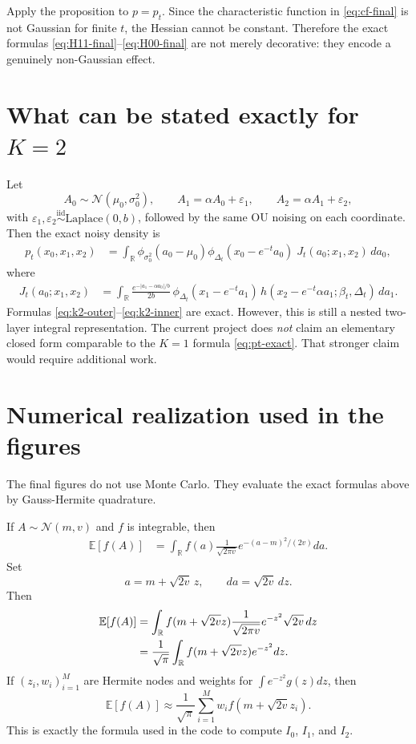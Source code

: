 \documentclass[11pt,a4paper]{article}
\newcommand{\R}{\mathbb{R}}
\newcommand{\E}{\mathbb{E}}
\newcommand{\Dt}{\Delta_t}
\newcommand{\pt}{p_t}
\begin{document}
Apply the proposition to $p=\pt$. Since the characteristic function in \eqref{eq:cf-final} is not Gaussian for finite $t$, the Hessian cannot be constant. Therefore the exact formulas \eqref{eq:H11-final}--\eqref{eq:H00-final} are not merely decorative: they encode a genuinely non-Gaussian effect.

\section[What can be stated exactly for K=2]{What can be stated exactly for $K=2$}
\label{sec:k2-statement}

Let
\[
A_0 \sim \mathcal N(\mu_0,\sigma_0^2),
\qquad
A_1 = \alpha A_0 + \varepsilon_1,
\qquad
A_2 = \alpha A_1 + \varepsilon_2,
\]
with $\varepsilon_1,\varepsilon_2 \stackrel{\mathrm{iid}}{\sim} \mathrm{Laplace}(0,b)$, followed by the same OU noising on each coordinate. Then the exact noisy density is
\begin{align}
\pt(x_0,x_1,x_2)
&=
\int_{\R} \phi_{\sigma_0^2}(a_0-\mu_0) \phi_{\Dt}(x_0-e^{-t}a_0)
\; J_t(a_0;x_1,x_2)\, da_0,
\label{eq:k2-outer}
\end{align}
where
\begin{align}
J_t(a_0;x_1,x_2)
&=
\int_{\R} \frac{e^{-|a_1-\alpha a_0|/b}}{2b}
\, \phi_{\Dt}(x_1-e^{-t}a_1)
\, h(x_2-e^{-t}\alpha a_1;\beta_t,\Dt)
\, da_1.
\label{eq:k2-inner}
\end{align}
Formulas \eqref{eq:k2-outer}--\eqref{eq:k2-inner} are exact. However, this is still a nested two-layer integral representation. The current project does \emph{not} claim an elementary closed form comparable to the $K=1$ formula \eqref{eq:pt-exact}. That stronger claim would require additional work.

\section{Numerical realization used in the figures}
\label{sec:numerics}

The final figures do not use Monte Carlo. They evaluate the exact formulas above by Gauss-Hermite quadrature.

If $A\sim\mathcal N(m,v)$ and $f$ is integrable, then
\begin{align}
\E[f(A)]
&=
\int_{\R} f(a) \frac{1}{\sqrt{2\pi v}} e^{-(a-m)^2/(2v)} da.
\label{eq:gh-start}
\end{align}
Set
\[
a = m + \sqrt{2v}\, z,
\qquad da = \sqrt{2v} \, dz.
\]
Then
\begin{align}
\E[f(A)]
&=
\int_{\R} f(m+\sqrt{2v}z) \frac{1}{\sqrt{2\pi v}} e^{-z^2} \sqrt{2v} \, dz
\notag\\
&=
\frac{1}{\sqrt{\pi}} \int_{\R} f(m+\sqrt{2v}z) e^{-z^2} dz.
\label{eq:gh-transform}
\end{align}
If $(z_i,w_i)_{i=1}^M$ are Hermite nodes and weights for $\int e^{-z^2} g(z) dz$, then
\begin{equation}
\E[f(A)] \approx \frac{1}{\sqrt{\pi}} \sum_{i=1}^M w_i f(m+\sqrt{2v}z_i).
\label{eq:gh-quadrature}
\end{equation}
This is exactly the formula used in the code to compute $I_0$, $I_1$, and $I_2$.
\end{document}
